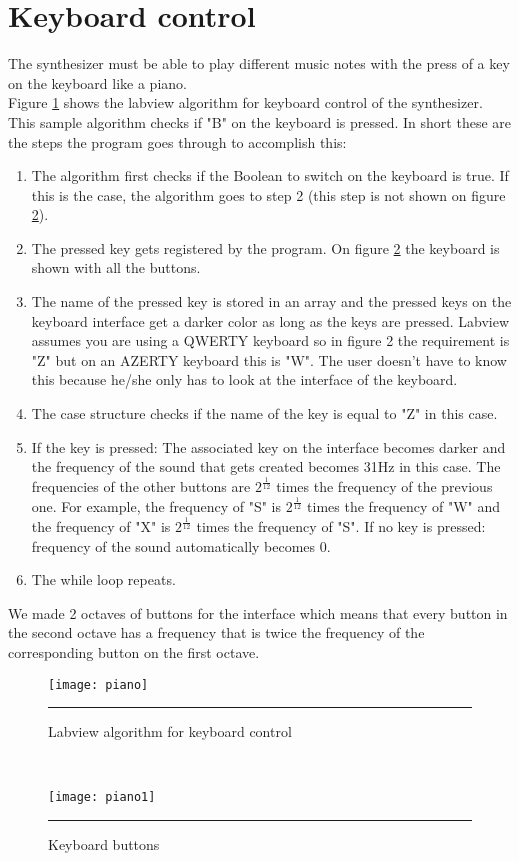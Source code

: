 \section{Keyboard control}
The synthesizer must be able to play different music notes with the press of a key on the keyboard like a piano.\\ 
Figure \ref{fig:piano} shows the labview algorithm for keyboard control of the synthesizer. This sample algorithm checks if "B" on the keyboard is pressed. In short these are the steps the program goes through to accomplish this: 
\begin{enumerate}
\item The algorithm first checks if the Boolean to switch on the keyboard is true. If this is the case, the algorithm goes to step 2 (this step is not shown on figure \ref{fig:piano1}).
\item The pressed key gets registered by the program. On figure \ref{fig:piano1} the keyboard is shown with all the buttons.
\item The name of the pressed key is stored in an array and the pressed keys on the keyboard interface get a darker color as long as the keys are pressed. Labview assumes you are using a QWERTY keyboard so in figure 2 the requirement is "Z" but on an AZERTY keyboard this is "W". The user doesn't have to know this because he/she only has to look at the interface of the keyboard.
\item The case structure checks if the name of the key is equal to "Z" in this case.
\item If the key is pressed: The associated key on the interface becomes darker and the frequency of the sound that gets created becomes 31Hz in this case. The frequencies of the other buttons are $2^{\frac{1}{12}}$ times the frequency of the previous one. For example, the frequency of "S" is $2^{\frac{1}{12}}$ times the frequency of "W" and the frequency of "X" is $2^{\frac{1}{12}}$ times the frequency of "S".
If no key is pressed: frequency of the sound automatically becomes 0.
\item The while loop repeats.
\end{enumerate}
We made 2 octaves of buttons for the interface which means that every button in the second octave has a frequency that is twice the frequency of the corresponding button on the first octave.
\begin{figure}[htbp]
\centering
\texttt{[image: piano]}
\rule{30em}{0.5pt}
\caption{Labview algorithm for keyboard control}
\label{fig:piano}
\end{figure} \\
\begin{figure}[htbp]
\centering
\texttt{[image: piano1]}
\rule{30em}{0.5pt}
\caption{Keyboard buttons}
\label{fig:piano1}
\end{figure} 
